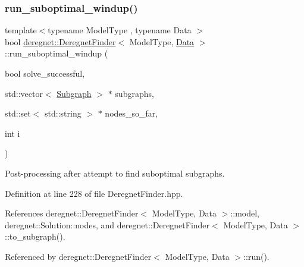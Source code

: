 \mbox{\label{classderegnet_1_1DeregnetFinder_a4021d92d787877187a24dcbaf0c1bad1}} 
\subsubsection{\texorpdfstring{run\+\_\+suboptimal\+\_\+windup()}{run\_suboptimal\_windup()}}
{\footnotesize\ttfamily template$<$typename Model\+Type , typename Data $>$ \\
bool \hyperlink{classderegnet_1_1DeregnetFinder}{deregnet\+::\+Deregnet\+Finder}$<$ Model\+Type, \hyperlink{avgdrgnt_8cpp_a1d1235306db276e9b36acba1db1509e8}{Data} $>$\+::run\+\_\+suboptimal\+\_\+windup (\begin{DoxyParamCaption}\item[{bool}]{solve\+\_\+successful,  }\item[{std\+::vector$<$ \hyperlink{structderegnet_1_1Subgraph}{Subgraph} $>$ $\ast$}]{subgraphs,  }\item[{std\+::set$<$ std\+::string $>$ $\ast$}]{nodes\+\_\+so\+\_\+far,  }\item[{int}]{i }\end{DoxyParamCaption})\hspace{0.3cm}{\ttfamily [private]}}



Post-\/processing after attempt to find suboptimal subgraphs. 



Definition at line 228 of file Deregnet\+Finder.\+hpp.



References deregnet\+::\+Deregnet\+Finder$<$ Model\+Type, Data $>$\+::model, deregnet\+::\+Solution\+::nodes, and deregnet\+::\+Deregnet\+Finder$<$ Model\+Type, Data $>$\+::to\+\_\+subgraph().



Referenced by deregnet\+::\+Deregnet\+Finder$<$ Model\+Type, Data $>$\+::run().


